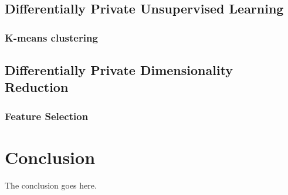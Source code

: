 \documentclass[10pt,conference]{IEEEtran}
\begin{document}
\subsection{Differentially Private Unsupervised Learning}


\subsubsection{K-means clustering}
\cite{Pinot2018Graph}

\subsection{Differentially Private Dimensionality Reduction}


\subsubsection{Feature Selection}


\section{Conclusion}
The conclusion goes here.






\end{document}
